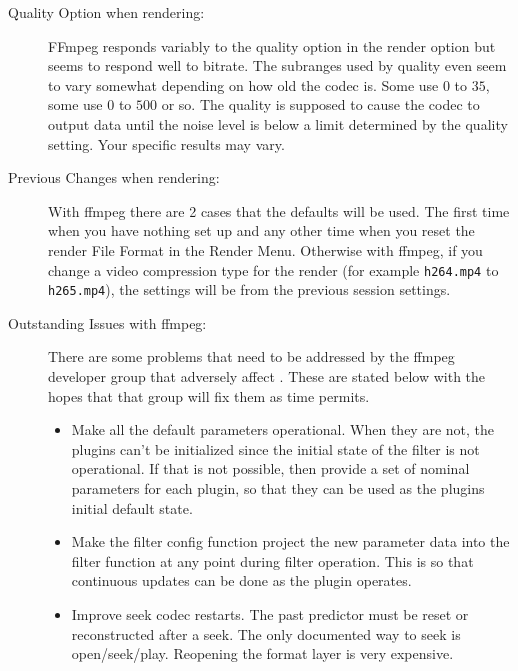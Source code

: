 \begin{description}
    \item[Quality Option when rendering:] FFmpeg responds variably to the quality option in the render option but seems to respond well to bitrate. The subranges used by quality even seem to vary somewhat depending on how old the codec is. Some use $0$ to $35$, some use $0$ to $500$ or so.  The quality is supposed to cause the codec to output data until the noise level is below a limit determined by the quality setting. Your specific results may vary.
    \item[Previous Changes when rendering:] With ffmpeg there are 2 cases that the defaults will be used.  The first time when you have nothing set up and any other time when you reset the render File Format in the Render Menu.  Otherwise with ffmpeg, if you change a video compression type for the render (for example \texttt{h264.mp4} to \texttt{h265.mp4}), the settings will be from the previous session settings.
    \item[Outstanding Issues with ffmpeg:] There are some problems that need to be addressed by the ffmpeg developer group that adversely affect \CGG{}.  These are stated below with the hopes that that group will fix them as time permits.
    \begin{itemize}
        \item Make all the default parameters operational.  When they are not, the \CGG{} plugins can't be initialized since the initial state of the filter is not operational.  If that is not possible, then provide a set of nominal parameters for each plugin, so that they can be used as the plugins initial default state.
        \item Make the filter config function project the new parameter data into the filter function at any point
        during filter operation.  This is so that continuous updates can be done as the plugin operates.
        \item Improve seek codec restarts.  The past predictor must be reset or reconstructed after a seek.  The  only documented way to seek is open/seek/play.  Reopening the format layer is very expensive.
    \end{itemize}
\end{description}
